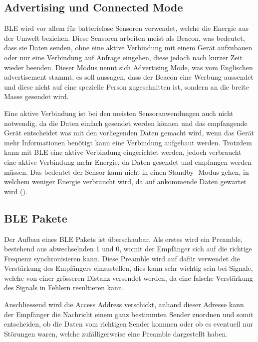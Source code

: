 \subsection{Advertising und Connected Mode}
BLE wird vor allem für batterielose Sensoren verwendet, welche die Energie aus der Umwelt beziehen. Diese Sensoren arbeiten meist als Beacon, was bedeutet, dass sie Daten senden, ohne eine aktive Verbindung mit einem Gerät aufzubauen oder nur eine Verbindung auf Anfrage eingehen, diese jedoch nach kurzer Zeit wieder beenden. Dieser Modus nennt sich Advertising Mode, was vom Englischen advertisement stammt, es soll aussagen, dass der Beacon eine Werbung aussendet und diese nicht auf eine spezielle Person zugeschnitten ist, sondern an die breite Masse gesendet wird.

Eine aktive Verbindung ist bei den meisten Sensoranwendungen auch nicht notwendig, da die Daten einfach gesendet werden können und das empfangende Gerät entscheidet was mit den vorliegenden Daten gemacht wird, wenn das Gerät mehr Informationen benötigt kann eine Verbindung aufgebaut werden. Trotzdem kann mit BLE eine aktive Verbindung eingerichtet werden, jedoch verbraucht eine aktive Verbindung mehr Energie, da Daten gesendet und empfangen werden müssen. Das bedeutet der Sensor kann nicht in einen Standby- Modus gehen, in welchem weniger Energie verbraucht wird, da auf ankommende Daten gewartet wird (\cite{BLE_advertising}).

\subsection{BLE Pakete}

Der Aufbau eines BLE Pakets ist überschaubar. Als erstes wird ein Preamble, bestehend aus abwechselnden 1 und 0, womit der Empfänger sich auf die richtige Frequenz synchronisieren kann. Diese Preamble wird auf dafür verwendet die Verstärkung des Empfängers einzustellen, dies kann sehr wichtig sein bei Signale, welche von einer grösseren Distanz versendet werden, da eine falsche Verstärkung des Signals in Fehlern resultieren kann.

Anschliessend wird die Access Address verschickt, anhand dieser Adresse kann der Empfänger die Nachricht einem ganz bestimmten Sender zuordnen und somit entscheiden, ob die Daten vom richtigen Sender kommen oder ob es eventuell nur Störungen waren, welche zufälligerweise eine Preamble dargestellt haben.

